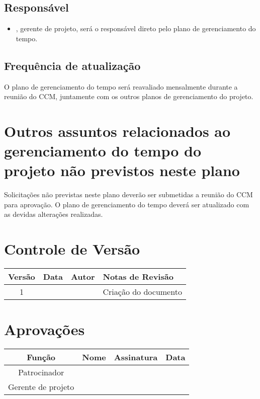\subsection{Responsável}

\begin{itemize}
	\item \projectManagerName{}, gerente de projeto, será o responsável direto pelo plano de gerenciamento do tempo.
\end{itemize}

\subsection{Frequência de atualização}

O plano de gerenciamento do tempo será reavaliado mensalmente durante a reunião do CCM, juntamente com os outros planos de gerenciamento do projeto.

\section{Outros assuntos relacionados ao gerenciamento do tempo do projeto não previstos neste plano}

Solicitações não previstas neste plano deverão ser submetidas a reunião do CCM para aprovação. O plano de gerenciamento do tempo deverá ser atualizado com as devidas alterações realizadas.

\section{Controle de Versão}

\begin{table}[H]
	\begin{tabularx}{\textwidth}{| c | c | X | X |}
		\hline
		\textbf{Versão} & \textbf{Data} & \textbf{Autor}      & \textbf{Notas de Revisão} \\
		\hline
		1                &               & \projectManagerName{} & Criação do documento     \\
		\hline
	\end{tabularx}
	\centering
\end{table}

\section{Aprovações}

\begin{table}[H]
	\begin{tabularx}{\textwidth}{| c | c | X | c |}
		\hline
		\textbf{Função}  & \textbf{Nome}       & \textbf{Assinatura}      & \textbf{Data} \\
		\hline
		Patrocinador       & \projectSponsorName{} & \projectSponsorSignature{} &               \\
		\hline
		Gerente de projeto & \projectManagerName{} & \projectManagerSignature{} &               \\
		\hline
	\end{tabularx}
	\centering
\end{table}
